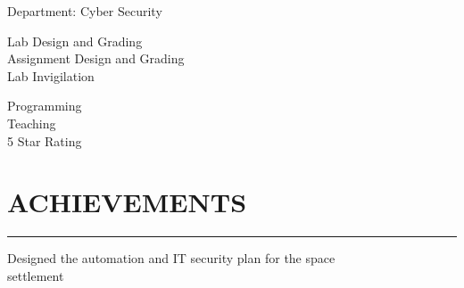 \documentclass[]{resume}
\begin{document}
\begin{minipage}[t]{0.66\textwidth}
    \vspace{-8pt}
    \hspace{5em}
    \begin{minipage}{0.85\textwidth\vspace{2pt}}
        Department: Cyber Security
    \end{minipage}


    \vspace{8pt}
     
    \noindent

    \vspace{-8pt}
    \hspace{5 em}
    \begin{minipage}{0.85\textwidth\vspace{2pt}}
        Lab Design and Grading\\
        Assignment Design and Grading\\
        Lab Invigilation
    \end{minipage}

    \vspace{8pt}
     
    \noindent

    \vspace{-5pt}
    \hspace{5 em}
    \begin{minipage}{0.85\textwidth\vspace{2pt}}
        Programming\\
        Teaching\\
        5 Star Rating
    \end{minipage}



    \section{ACHIEVEMENTS}
    \noindent\rule{12.5 cm}{0.4pt}

     
    \vspace{4pt}
    \begin{minipage}{0.85\textwidth\vspace{4pt}}
        Designed the automation and IT security plan for the space\\settlement
    \end{minipage}


\end{minipage}
\end{document}

